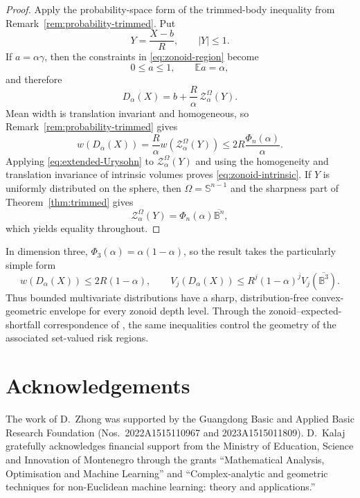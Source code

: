 \documentclass[11pt,reqno]{amsart}
\theoremstyle{remark}
\begin{document}
\begin{proof}
Apply the probability-space form of the trimmed-body inequality from
Remark~\ref{rem:probability-trimmed}.  Put
\[
 Y=\frac{X-b}{R},
 \qquad |Y|\le1.
\]
If $a=\alpha\gamma$, then the constraints in
\eqref{eq:zonoid-region} become
\[
 0\le a\le1,
 \qquad
 \mathbb E a=\alpha,
\]
and therefore
\begin{equation}\label{eq:zonoid-trimmed-identity}
 D_\alpha(X)
 =
 b+\frac{R}{\alpha}\,\mathcal Z_\alpha^\Omega(Y).
\end{equation}
Mean width is translation invariant and homogeneous, so
Remark~\ref{rem:probability-trimmed} gives
\[
 w(D_\alpha(X))
 =
 \frac{R}{\alpha}w(\mathcal Z_\alpha^\Omega(Y))
 \le
 2R\frac{\Phi_n(\alpha)}{\alpha}.
\]
Applying \eqref{eq:extended-Urysohn} to
$\mathcal Z_\alpha^\Omega(Y)$ and using the homogeneity and translation
invariance of intrinsic volumes proves \eqref{eq:zonoid-intrinsic}.
If $Y$ is uniformly distributed on the sphere, then
$\Omega=\mathbb S^{n-1}$ and the sharpness part of
Theorem~\ref{thm:trimmed} gives
\[
 \mathcal Z_\alpha^\Omega(Y)
 =
 \Phi_n(\alpha)\overline{\mathbb B^n},
\]
which yields equality throughout.
\end{proof}

In dimension three, $\Phi_3(\alpha)=\alpha(1-\alpha)$, so the result takes
the particularly simple form
\begin{equation}\label{eq:zonoid-3d}
 w(D_\alpha(X))\le2R(1-\alpha),
 \qquad
 V_j(D_\alpha(X))
 \le
 R^j(1-\alpha)^jV_j(\overline{\mathbb B^3}).
\end{equation}
Thus bounded multivariate distributions have a sharp, distribution-free
convex-geometric envelope for every zonoid depth level.  Through the
zonoid--expected-shortfall correspondence of
\cite{CascosMolchanov}, the same inequalities control the geometry of the
associated set-valued risk regions.


\section*{Acknowledgements}
The work of D.~Zhong was supported by the Guangdong Basic and Applied Basic Research Foundation (Nos.~2022A1515110967 and 2023A1515011809).  D.~Kalaj gratefully acknowledges financial support from the Ministry of Education, Science and Innovation of Montenegro through the grants ``Mathematical Analysis, Optimisation and Machine Learning'' and ``Complex-analytic and geometric techniques for non-Euclidean machine learning: theory and applications.''
\end{document}
